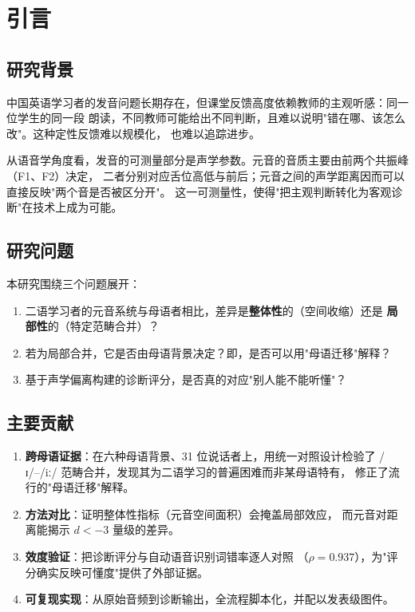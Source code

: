 \documentclass[11pt,a4paper]{ctexart}
\newcommand{\ipa}[1]{/#1/}
\begin{document}
\newpage
\tableofcontents
\newpage

\section{引言}

\subsection{研究背景}

中国英语学习者的发音问题长期存在，但课堂反馈高度依赖教师的主观听感：同一位学生的同一段
朗读，不同教师可能给出不同判断，且难以说明"错在哪、该怎么改"。这种定性反馈难以规模化，
也难以追踪进步。

从语音学角度看，发音的可测量部分是声学参数。元音的音质主要由前两个共振峰（F1、F2）决定，
二者分别对应舌位高低与前后；元音之间的声学距离因而可以直接反映"两个音是否被区分开"。
这一可测量性，使得"把主观判断转化为客观诊断"在技术上成为可能。

\subsection{研究问题}

本研究围绕三个问题展开：

\begin{enumerate}[leftmargin=2em,itemsep=2pt]
  \item 二语学习者的元音系统与母语者相比，差异是\textbf{整体性}的（空间收缩）还是
        \textbf{局部性}的（特定范畴合并）？
  \item 若为局部合并，它是否由母语背景决定？即，是否可以用"母语迁移"解释？
  \item 基于声学偏离构建的诊断评分，是否真的对应"别人能不能听懂"？
\end{enumerate}

\subsection{主要贡献}

\begin{enumerate}[leftmargin=2em,itemsep=2pt]
  \item \textbf{跨母语证据}：在六种母语背景、31 位说话者上，用统一对照设计检验了
        \ipa{ɪ}–\ipa{iː} 范畴合并，发现其为二语学习的普遍困难而非某母语特有，
        修正了流行的"母语迁移"解释。
  \item \textbf{方法对比}：证明整体性指标（元音空间面积）会掩盖局部效应，
        而元音对距离能揭示 $d<-3$ 量级的差异。
  \item \textbf{效度验证}：把诊断评分与自动语音识别词错率逐人对照
        （$\rho=0.937$），为"评分确实反映可懂度"提供了外部证据。
  \item \textbf{可复现实现}：从原始音频到诊断输出，全流程脚本化，并配以发表级图件。
\end{enumerate}
\end{document}
